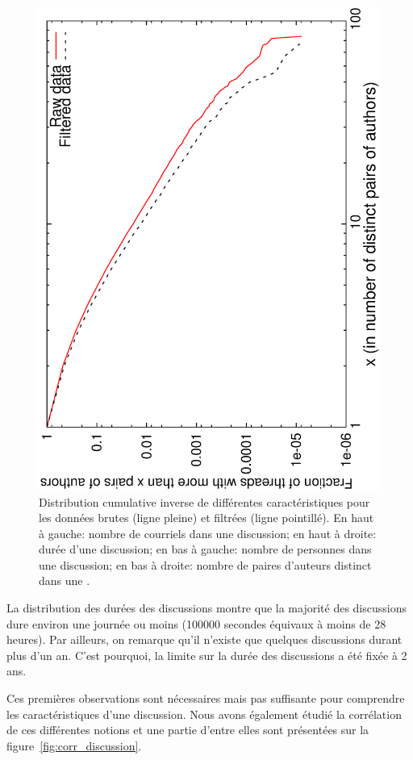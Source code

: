 \begin{figure}
	\includegraphics[angle=-90, width=0.49\linewidth]{img/mailing/authorpairs-ccdf.eps}
	
	\caption{Distribution cumulative inverse de différentes caractéristiques pour les données brutes (ligne pleine) et filtrées (ligne pointillé). En haut à gauche: nombre de courriels dans une discussion; en haut à droite: durée d'une discussion; en bas à gauche: nombre de personnes dans une discussion; en bas à droite: nombre de paires d'auteurs distinct dans une .}
	\label{fig:dists_discussion}
\end{figure}

La distribution des durées des discussions montre que la majorité des discussions dure environ une journée ou moins (100000 secondes équivaux à moins de 28 heures).
Par ailleurs, on remarque qu'il n'existe que quelques discussions durant plus d'un an.
C'est pourquoi, la limite sur la durée des discussions a été fixée à 2 ans.

Ces premières observations sont nécessaires mais pas suffisante pour comprendre les caractéristiques d'une discussion.
Nous avons également étudié la corrélation de ces différentes notions et une partie d'entre elles sont présentées sur la figure~\ref{fig:corr_discussion}.


